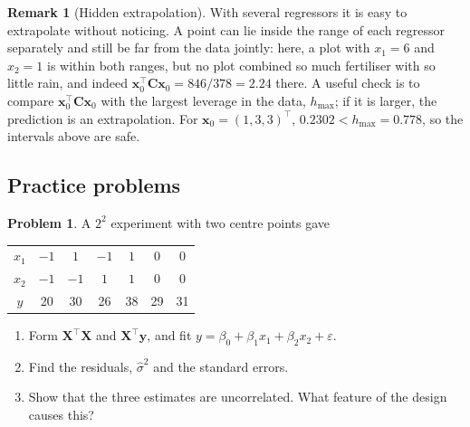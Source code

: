\documentclass[11pt,a4paper]{article}
\numberwithin{equation}{section}
\theoremstyle{definition}
\newtheorem*{remark}{Remark}
\newtheorem{problemx}{Problem}[subsection]
\newenvironment{problem}{\begin{problemx}}{\end{problemx}}
\begin{document}
\begin{remark}[Hidden extrapolation]
With several regressors it is easy to extrapolate without noticing. A point can lie inside the
range of each regressor separately and still be far from the data jointly: here, a plot with
$x_1 = 6$ and $x_2 = 1$ is within both ranges, but no plot combined so much fertiliser with so
little rain, and indeed $\mathbf{x}_0^\top\mathbf{C}\mathbf{x}_0 = 846/378 = 2.24$ there.
A useful check is to compare $\mathbf{x}_0^\top\mathbf{C}\mathbf{x}_0$ with the
largest leverage in the data, $h_{\max}$; if it is larger, the prediction is an extrapolation.
For $\mathbf{x}_0 = (1, 3, 3)^\top$, $0.2302 < h_{\max} = 0.778$, so the intervals above are
safe.
\end{remark}

\subsection{Practice problems}
\begin{problem}\label{prob:orth}
A $2^2$ experiment with two centre points gave
\begin{center}
\begin{tabular}{c|cccccc}
$x_1$ & $-1$ & $1$ & $-1$ & $1$ & $0$ & $0$ \\
$x_2$ & $-1$ & $-1$ & $1$ & $1$ & $0$ & $0$ \\
\hline
$y$ & 20 & 30 & 26 & 38 & 29 & 31 \\
\end{tabular}
\end{center}
\begin{enumerate}[label=(\alph*)]
\item Form $\mathbf{X}^\top\mathbf{X}$ and $\mathbf{X}^\top\mathbf{y}$, and fit
$y = \beta_0 + \beta_1 x_1 + \beta_2 x_2 + \varepsilon$.
\item Find the residuals, $\hat\sigma^2$ and the standard errors.
\item Show that the three estimates are uncorrelated. What feature of the design causes this?
\end{enumerate}
\end{problem}
\end{document}
